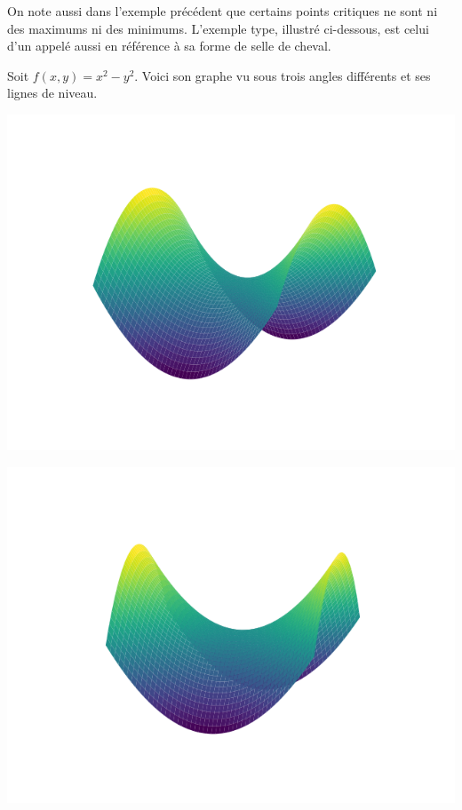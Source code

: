 On note aussi dans l'exemple précédent que certains points critiques ne sont ni des maximums ni des minimums. L'exemple type, illustré ci-dessous, est celui d'un  appelé aussi  en référence à sa forme de selle de cheval.

\begin{exemple}{}{}
	Soit $f(x,y)=x^2-y^2$.
	Voici son graphe vu sous trois angles différents et ses lignes de niveau.
	
	\begin{center}
		\includegraphics[scale=\myscale,scale=0.7]{figures/gradient-surface-3a}
	\end{center}
	\begin{center}
		\includegraphics[scale=\myscale,scale=0.5]{figures/gradient-surface-3b}

\end{center}
\end{exemple}
